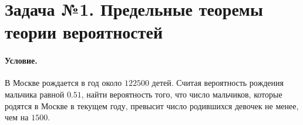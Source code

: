
\section{Задача №1. Предельные теоремы теории вероятностей}

\paragraph{Условие.} В Москве рождается в год около $122500$ детей. Считая вероятность рождения мальчика равной $0.51$, найти вероятность того, что число мальчиков, которые родятся в Москве в текущем году, превысит число родившихся девочек не менее, чем на $1500$.